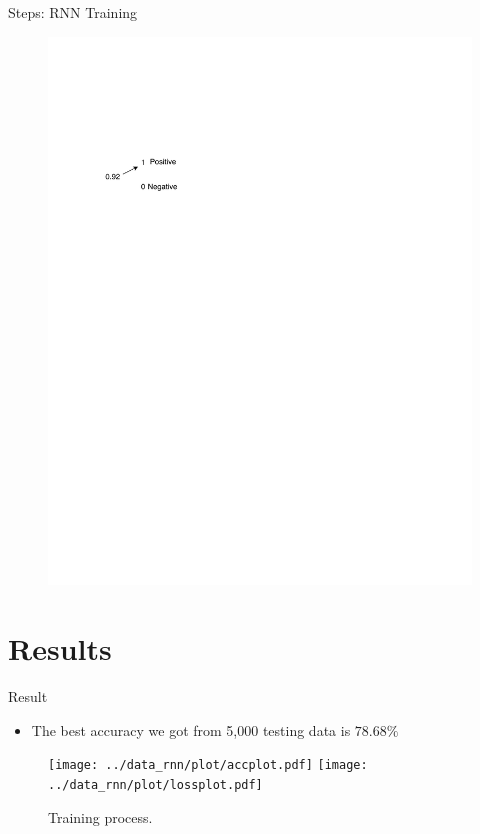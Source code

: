 \documentclass{beamer}
\begin{document}
\begin{frame}{Steps: RNN Training}
\begin{figure}[h]
\begin{minipage}{0.29\textwidth}
            \includegraphics[trim={2.5cm 15.2cm 3cm 6cm},clip,width=5in]{img/output.pdf}
        \end{minipage}
        
    \end{figure}
		
\end{frame}

\section{Results}%
\label{sec:results}
\begin{frame}{Result}
    \begin{itemize}
        \item The best accuracy we got from 5,000 testing data is $78.68\%$
    \end{itemize}
    \begin{figure}[h]
        \centering
        \texttt{[image: ../data\_rnn/plot/accplot.pdf]}
        \texttt{[image: ../data\_rnn/plot/lossplot.pdf]}
        \caption{Training process.\label{fig:result}}
    \end{figure}

\end{frame}
\end{document}
